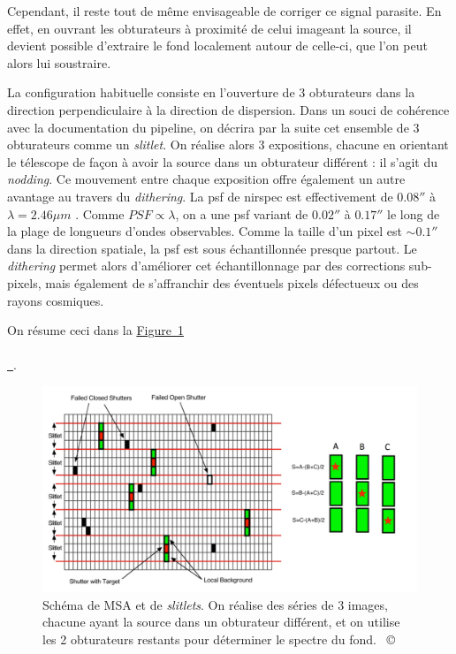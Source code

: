 \documentclass[12pt, a4paper]{article}
\newcommand{\customcite}[1]{\mbox{
  {\small \copyright} \cite{#1}}
}
\newcommand*{\figref}[2][]{%
  \hyperref[{#2}]{%
    Figure~\ref*{#2}%
    \ifx\\#1\\%
    \else
      \,#1%
    \fi
  }%
}
\begin{document}
Cependant, il reste tout de même envisageable de corriger ce signal parasite. En effet, en ouvrant les obturateurs à proximité de celui imageant la source, il devient possible d'extraire le fond localement autour de celle-ci, que l'on peut alors lui soustraire.

La configuration habituelle consiste en l'ouverture de 3 obturateurs dans la direction perpendiculaire à la direction de dispersion. Dans un souci de cohérence avec la documentation du pipeline, on décrira par la suite cet ensemble de 3 obturateurs comme un \textit{slitlet}. On réalise alors 3 expositions, chacune en orientant le télescope de façon à avoir la source dans un obturateur différent : il s'agit du \textit{nodding}. Ce mouvement entre chaque exposition offre également un autre avantage au travers du \textit{dithering}. La \gls{psf} de \gls{nirspec} est effectivement de $0.08 ''$ à $\lambda = 2.46 \mu m$ \parencite{10_1051_0004_6361_202142663}. 
Comme $PSF \propto \lambda$, on a une \gls{psf} variant de $0.02 ''$ à $0.17''$ le long de la plage de longueurs d'ondes observables. Comme la taille d'un pixel est $\sim 0.1''$ dans la direction spatiale, la \gls{psf} est sous échantillonnée presque partout. Le \textit{dithering} permet alors d'améliorer cet échantillonnage par des corrections sub-pixels, mais également de s'affranchir des éventuels pixels défectueux ou des rayons cosmiques.

On résume ceci dans la \figref{fig:msa_slitlet}.


\begin{figure}[H]
  \centering
  \includegraphics[scale=0.2]{assets/MSA_sky_strategy.png}
  \caption{Schéma de MSA et de \textit{slitlets}. On réalise des séries de 3 images, chacune ayant la source dans un obturateur différent, et on utilise les 2 obturateurs restants pour déterminer le spectre du fond. \customcite{mos}}
  \label{fig:msa_slitlet}
\end{figure}
\end{document}
